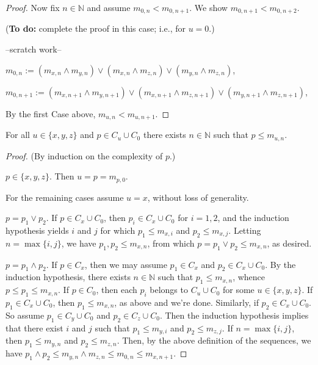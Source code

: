 \begin{proof}
  Now fix $n\in \mathbb{N}$ and assume $m_{0,n} < m_{0,n+1}$.
  We show $m_{0,n+1} < m_{0,n+2}$.

  ({\bf To do:} complete the proof in this case; i.e., for $u = 0$.)

  --scratch work--

  $m_{0, n} := (m_{x,n} \wedge m_{y,n}) \vee (m_{x,n} \wedge m_{z,n})\vee (m_{y,n} \wedge m_{z,n})$,

  $m_{0, n+1} := (m_{x,n+1} \wedge m_{y,n+1}) \vee (m_{x,n+1} \wedge m_{z,n+1})\vee (m_{y,n+1} \wedge m_{z,n+1})$,

  By the first Case above, $m_{u,n} < m_{u,n+1}$.
\end{proof}


\begin{lemma}\label{lem:2} %
For all $u \in \{x, y, z\}$ and $p \in C_u \cup C_0$ there exists $n \in \mathbb N$ such that $p\leqslant m_{u,n}$.  
\end{lemma}

\begin{proof}(By induction on the complexity of $p$.) 

 $p\in \{x, y, z\}$. Then $u = p = m_{p,0}$.

For the remaining cases assume $u = x$, without loss of generality.

 $p = p_1 \vee p_2$.  
  If $p \in C_x\cup C_0$, then $p_i \in C_x \cup C_0$ for $i = 1, 2$, and 
  the induction hypothesis yields $i$ and $j$ for which $p_1 \leqslant m_{x, i}$ and $p_2 \leqslant m_{x, j}$. Letting $n = \max\{i, j\}$, we have 
  $p_1, p_2 \leqslant m_{x, n}$, from which 
  $p = p_1 \vee p_2 \leqslant m_{x, n}$, as desired.

 $p = p_1 \wedge p_2$.  
  If $p \in C_x$, then we may assume $p_1 \in C_x$ and $p_2 \in C_x \cup C_0$. By the induction hypothesis, there exists $n\in \mathbb N$ such that $p_1 \leqslant m_{x, n}$, whence $p \leqslant p_1 \leqslant m_{x,n}$.
If $p \in C_0$, then each $p_i$ belongs to $C_u \cup C_0$ for some $u\in \{x, y, z\}$.  If $p_1 \in C_x \cup C_0$, then $p_1 \leqslant m_{x, n}$, as above and we're done.  Similarly, if $p_2 \in C_x \cup C_0$.  So assume $p_1 \in C_y \cup C_0$ and $p_2 \in C_z \cup C_0$. Then the induction hypothesis implies that there exist $i$ and $j$ such that 
  $p_1 \leqslant m_{y, i}$ and $p_2 \leqslant m_{z, j}$. If $n = \max\{i, j\}$, then
  $p_1 \leqslant m_{y, n}$ and $p_2 \leqslant m_{z, n}$.  Then, by the above definition of the sequences, we have
  $p_1 \wedge p_2 \leqslant m_{y, n} \wedge m_{z, n} \leqslant m_{0,n} \leqslant m_{x,n+1}$.
\end{proof}

